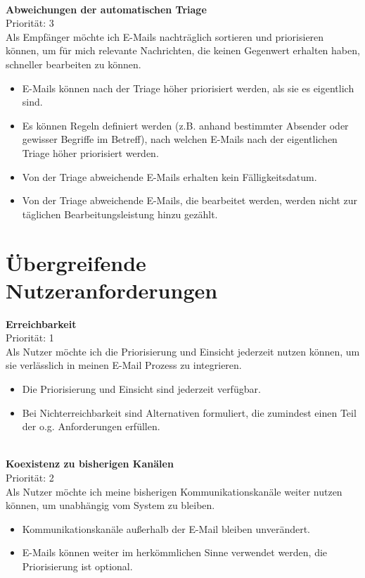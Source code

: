 \noindent
\\ \textbf{Abweichungen der automatischen Triage} \\
Priorität: 3 \\
Als Empfänger möchte ich E-Mails nachträglich sortieren und priorisieren können, um für mich relevante Nachrichten, die keinen Gegenwert erhalten haben, schneller bearbeiten zu können.
\begin{itemize}
    \item E-Mails können nach der Triage höher priorisiert werden, als sie es eigentlich sind.
    \item Es können Regeln definiert werden (z.B. anhand bestimmter Absender oder gewisser Begriffe im Betreff), nach welchen E-Mails nach der eigentlichen Triage höher priorisiert werden.
    \item Von der Triage abweichende E-Mails erhalten kein Fälligkeitsdatum.
    \item Von der Triage abweichende E-Mails, die bearbeitet werden, werden nicht zur täglichen Bearbeitungsleistung hinzu gezählt.
\end{itemize}

\newpage
\section{Übergreifende Nutzeranforderungen}

\textbf{Erreichbarkeit} \\
Priorität: 1 \\
Als Nutzer möchte ich die Priorisierung und Einsicht jederzeit nutzen können, um sie verlässlich in meinen E-Mail Prozess zu integrieren.
\begin{itemize}
    \item Die Priorisierung und Einsicht sind jederzeit verfügbar.
    \item Bei Nichterreichbarkeit sind Alternativen formuliert, die zumindest einen Teil der o.g. Anforderungen erfüllen.
\end{itemize}

\noindent
\\ \textbf{Koexistenz zu bisherigen Kanälen} \\
Priorität: 2 \\
Als Nutzer möchte ich meine bisherigen Kommunikationskanäle weiter nutzen können, um unabhängig vom System zu bleiben.
\begin{itemize}
    \item Kommunikationskanäle außerhalb der E-Mail bleiben unverändert.
    \item E-Mails können weiter im herkömmlichen Sinne verwendet werden, die Priorisierung ist optional.
\end{itemize}

